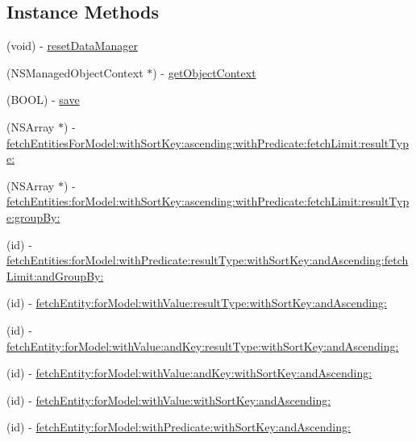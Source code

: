 \subsection*{Instance Methods}
\begin{DoxyCompactItemize}
\item 
(void) -\/ \hyperlink{interface_pxe_player_data_manager_a0ad90b7df39403c27a446c39c4e4eb82}{reset\-Data\-Manager}
\item 
(N\-S\-Managed\-Object\-Context $\ast$) -\/ \hyperlink{interface_pxe_player_data_manager_a385a3455e034595d6e803affd5086beb}{get\-Object\-Context}
\item 
(B\-O\-O\-L) -\/ \hyperlink{interface_pxe_player_data_manager_a6bace115219e1f02d80778c1c86e2288}{save}
\item 
(N\-S\-Array $\ast$) -\/ \hyperlink{interface_pxe_player_data_manager_ac1364c4e2092c8e8bac70f2d0414afd6}{fetch\-Entities\-For\-Model\-:with\-Sort\-Key\-:ascending\-:with\-Predicate\-:fetch\-Limit\-:result\-Type\-:}
\item 
(N\-S\-Array $\ast$) -\/ \hyperlink{interface_pxe_player_data_manager_a0c8e256d49098492ce4321c3279d18cf}{fetch\-Entities\-:for\-Model\-:with\-Sort\-Key\-:ascending\-:with\-Predicate\-:fetch\-Limit\-:result\-Type\-:group\-By\-:}
\item 
(id) -\/ \hyperlink{interface_pxe_player_data_manager_a9580aae143e1e877a11cdf0ba1182657}{fetch\-Entities\-:for\-Model\-:with\-Predicate\-:result\-Type\-:with\-Sort\-Key\-:and\-Ascending\-:fetch\-Limit\-:and\-Group\-By\-:}
\item 
(id) -\/ \hyperlink{interface_pxe_player_data_manager_a942085f5dca3135ef85620cf3548fbf7}{fetch\-Entity\-:for\-Model\-:with\-Value\-:result\-Type\-:with\-Sort\-Key\-:and\-Ascending\-:}
\item 
(id) -\/ \hyperlink{interface_pxe_player_data_manager_a6496f883d62c062fcbb2c54f420edc17}{fetch\-Entity\-:for\-Model\-:with\-Value\-:and\-Key\-:result\-Type\-:with\-Sort\-Key\-:and\-Ascending\-:}
\item 
(id) -\/ \hyperlink{interface_pxe_player_data_manager_a330908b8093f34c3562a2b1a0d3ff230}{fetch\-Entity\-:for\-Model\-:with\-Value\-:and\-Key\-:with\-Sort\-Key\-:and\-Ascending\-:}
\item 
(id) -\/ \hyperlink{interface_pxe_player_data_manager_a1598d37ec5515df318bb6395fb55373d}{fetch\-Entity\-:for\-Model\-:with\-Value\-:with\-Sort\-Key\-:and\-Ascending\-:}
\item 
(id) -\/ \hyperlink{interface_pxe_player_data_manager_a91a735b462c60d518709560e1e23ed6e}{fetch\-Entity\-:for\-Model\-:with\-Predicate\-:with\-Sort\-Key\-:and\-Ascending\-:}

\end{DoxyCompactItemize}
